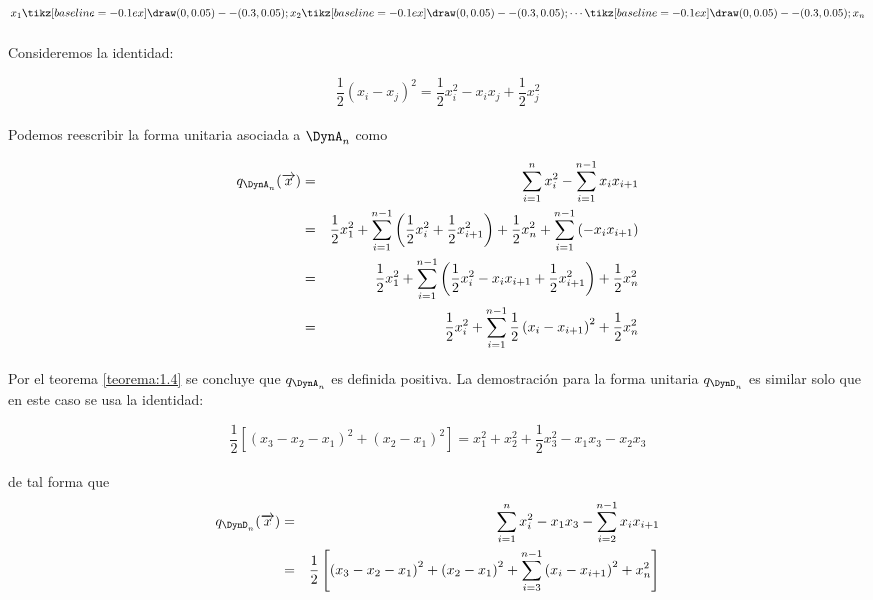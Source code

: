 $$x_{1} \tikz[baseline=-0.1ex]\draw (0,0.05) -- (0.3,0.05); x_{2} \tikz[baseline=-0.1ex]\draw (0,0.05) -- (0.3,0.05); \cdots \tikz[baseline=-0.1ex]\draw (0,0.05) -- (0.3,0.05); x_{n}$$

\paragraph{}
Consideremos la identidad:

\begin{equation*}
    \frac{1}{2}\left(x_{i} - x_{j}\right)^{2} = \frac{1}{2}x_{i}^{2} - x_{i}x_{j} + \frac{1}{2}x_{j}^{2}
\end{equation*}

\paragraph{}
Podemos reescribir la forma unitaria asociada a $\DynA_{n}$ como

\begin{eqnarray*}
 q_{\DynA_{n}}(\overrightarrow{x}) &  =  & \sum_{i=1}^{n}x_{i}^{2} - \sum_{i=1}^{n-1} x_{i}x_{i+1}\\
 &  =  & \frac{1}{2}x_{1}^{2} + \sum_{i=1}^{n-1}\left(\frac{1}{2}x_{i}^{2} + \frac{1}{2} x_{i+1}^{2}\right) + \frac{1}{2}x_{n}^{2} + \sum_{i=1}^{n-1} \left(-x_{i}x_{i+1}\right)\\
 &  =  & \frac{1}{2}x_{1}^{2} + \sum_{i=1}^{n-1}\left(\frac{1}{2}x_{i}^{2} - x_{i}x_{i+1} + \frac{1}{2}x_{i+1}^{2} \right) + \frac{1}{2}x_{n}^{2}\\
 &  =  & \frac{1}{2}x_{i}^{2} + \sum_{i=1}^{n-1}\frac{1}{2}\left(x_{i} - x_{i+1}\right)^{2} + \frac{1}{2}x_{n}^{2}
\end{eqnarray*}

\paragraph{}
Por el teorema \ref{teorema:1.4} se concluye que $q_{\DynA_{n}}$ es definida positiva. La demostración para la forma unitaria $q_{\DynD_{n}}$ es similar solo que en este caso se usa la identidad:

\begin{equation*}
    \frac{1}{2}\left[\left(x_{3} - x_{2} - x_{1}\right)^{2} + \left(x_{2} - x_{1}\right)^{2}\right] = x_{1}^{2} + x_{2}^{2} + \frac{1}{2}x_{3}^{2} - x_{1}x_{3} - x_{2}x_{3}
\end{equation*}

\paragraph{}
de tal forma que 
\begin{eqnarray*}
 q_{\DynD_{n}}(\overrightarrow{x}) &  =  & \sum_{i=1}^{n}x_{i}^{2} - x_{1}x_{3} -  \sum_{i=2}^{n-1} x_{i}x_{i+1}\\
 &  =  & \frac{1}{2}\left[\left(x_{3} - x_{2} - x_{1}\right)^{2} + \left(x_{2} - x_{1}\right)^{2} + \sum_{i=3}^{n-1}\left(x_{i} - x_{i+1}\right)^{2}  + x_{n}^{2}\right]
\end{eqnarray*}

